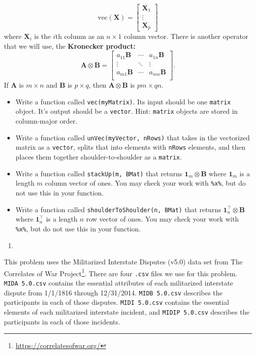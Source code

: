 \documentclass[
  12pt,
  krantz2]{krantz}
\providecommand{\tightlist}{%
  \setlength{\itemsep}{0pt}\setlength{\parskip}{0pt}}
\renewcommand{\href}[2]{#2\footnote{\url{#1}}}
\begin{document}
\[
\text{vec}(\mathbf{X}) =\begin{bmatrix} \mathbf{X}_1 \\ \vdots \\ \mathbf{X}_p \end{bmatrix} 
\]
where \(\mathbf{X}_i\) is the \(i\)th column as an \(n \times 1\) column vector. There is another operator that we will use, the \textbf{Kronecker product:}
\[
\mathbf{A} \otimes \mathbf{B} = 
\begin{bmatrix}
a_{11} \mathbf{B} & \cdots & a_{1n} \mathbf{B} \\
\vdots & \ddots & \vdots \\
a_{m1} \mathbf{B} & \cdots & a_{mn} \mathbf{B} \\
\end{bmatrix}.
\]
If \(\mathbf{A}\) is \(m \times n\) and \(\mathbf{B}\) is \(p \times q\), then \(\mathbf{A} \otimes \mathbf{B}\) is \(pm \times qn\).

\begin{itemize}
\tightlist
\item
  Write a function called \texttt{vec(myMatrix)}. Its input should be one \texttt{matrix} object. It's output should be a \texttt{vector}. Hint: \texttt{matrix} objects are stored in column-major order.
\item
  Write a function called \texttt{unVec(myVector,\ nRows)} that takes in the vectorized matrix as a \texttt{vector}, splits that into elements with \texttt{nRows} elements, and then places them together shoulder-to-shoulder as a \texttt{matrix}.
\item
  Write a function called \texttt{stackUp(m,\ BMat)} that returns \(\mathbf{1}_m \otimes \mathbf{B}\) where \(\mathbf{1}_m\) is a length \(m\) column vector of ones. You may check your work with \texttt{\%x\%}, but do not use this in your function.
\item
  Write a function called \texttt{shoulderToShoulder(n,\ BMat)} that returns \(\mathbf{1}^\intercal_n \otimes \mathbf{B}\) where \(\mathbf{1}_n^\intercal\) is a length \(n\) row vector of ones. You may check your work with \texttt{\%x\%}, but do not use this in your function.
\end{itemize}

\begin{enumerate}
\def\labelenumi{\arabic{enumi}.}
\setcounter{enumi}{3}
\tightlist
\item
\end{enumerate}

This problem uses the Militarized Interstate Disputes (v5.0) \citep{mid5} data set from \href{https://correlatesofwar.org/}{The Correlates of War Project}. There are four \texttt{.csv} files we use for this problem. \texttt{MIDA\ 5.0.csv} contains the essential attributes of each militarized interstate dispute from 1/1/1816 through 12/31/2014. \texttt{MIDB\ 5.0.csv} describes the participants in each of those disputes. \texttt{MIDI\ 5.0.csv} contains the essential elements of each militarized interstate incident, and \texttt{MIDIP\ 5.0.csv} describes the participants in each of those incidents.
\end{document}

